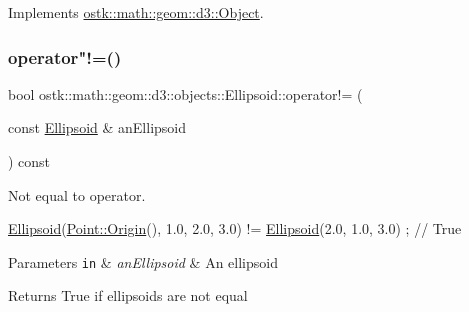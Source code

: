 Implements \hyperlink{classostk_1_1math_1_1geom_1_1d3_1_1_object_a271a1964cd208be85ce9a0a429395ad8}{ostk\+::math\+::geom\+::d3\+::\+Object}.

\mbox{\label{classostk_1_1math_1_1geom_1_1d3_1_1objects_1_1_ellipsoid_aaeed509e3703368fe9f0513d5807f9cb}} 
\subsubsection{\texorpdfstring{operator"!=()}{operator!=()}}
{\footnotesize\ttfamily bool ostk\+::math\+::geom\+::d3\+::objects\+::\+Ellipsoid\+::operator!= (\begin{DoxyParamCaption}\item[{const \hyperlink{classostk_1_1math_1_1geom_1_1d3_1_1objects_1_1_ellipsoid}{Ellipsoid} \&}]{an\+Ellipsoid }\end{DoxyParamCaption}) const}



Not equal to operator. 


\begin{DoxyCode}
\hyperlink{classostk_1_1math_1_1geom_1_1d3_1_1objects_1_1_ellipsoid_a106c71abf9503f3d06b2613c1c7e9d65}{Ellipsoid}(\hyperlink{classostk_1_1math_1_1geom_1_1d3_1_1objects_1_1_point_a079c199f08b015d456d02728a71b534c}{Point::Origin}(), 1.0, 2.0, 3.0) != \hyperlink{classostk_1_1math_1_1geom_1_1d3_1_1objects_1_1_ellipsoid_a106c71abf9503f3d06b2613c1c7e9d65}{Ellipsoid}(2.0, 1.0, 3.0) ; \textcolor{comment}{//
       True}
\end{DoxyCode}



\begin{DoxyParams}[1]{Parameters}
\mbox{\tt in}  & {\em an\+Ellipsoid} & An ellipsoid \\
\hline
\end{DoxyParams}
\begin{DoxyReturn}{Returns}
True if ellipsoids are not equal 
\end{DoxyReturn}
\mbox{\label{classostk_1_1math_1_1geom_1_1d3_1_1objects_1_1_ellipsoid_add7aa81a702b745d73f44b81359ecc4b}} 
